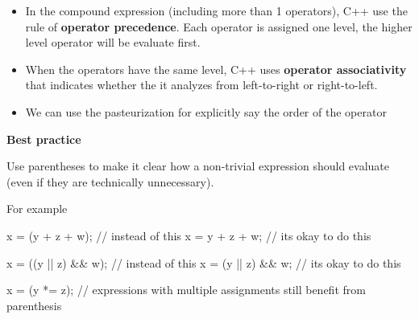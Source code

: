\documentclass[
  letterpaper,
  DIV=11,
  numbers=noendperiod]{scrreprt}
\newenvironment{Shaded}{\begin{snugshade}}{\end{snugshade}}
\newcommand{\ErrorTok}[1]{\textcolor[rgb]{0.68,0.00,0.00}{#1}}
\newcommand{\NormalTok}[1]{\textcolor[rgb]{0.00,0.23,0.31}{#1}}
\newcommand{\OtherTok}[1]{\textcolor[rgb]{0.00,0.23,0.31}{#1}}
\newcommand{\SpecialCharTok}[1]{\textcolor[rgb]{0.37,0.37,0.37}{#1}}
\newcommand{\StringTok}[1]{\textcolor[rgb]{0.13,0.47,0.30}{#1}}
\begin{document}
\begin{itemize}
\item
  In the compound expression (including more than 1 operators), C++ use
  the rule of \textbf{operator precedence}. Each operator is assigned
  one level, the higher level operator will be evaluate first.
\item
  When the operators have the same level, C++ uses \textbf{operator
  associativity} that indicates whether the it analyzes from
  left-to-right or right-to-left.
\item
  We can use the pasteurization for explicitly say the order of the
  operator
\end{itemize}

\begin{tcolorbox}[enhanced jigsaw, toprule=.15mm, rightrule=.15mm, opacityback=0, breakable, leftrule=.75mm, colback=white, colframe=quarto-callout-tip-color-frame, arc=.35mm, left=2mm, bottomrule=.15mm]
\begin{minipage}[t]{5.5mm}
\textcolor{quarto-callout-tip-color}{\faLightbulb}
\end{minipage}%
\begin{minipage}[t]{\textwidth - 5.5mm}

\textbf{Best practice}\vspace{2mm}

Use parentheses to make it clear how a non-trivial expression should
evaluate (even if they are technically unnecessary).

\end{minipage}%
\end{tcolorbox}

For example

\begin{Shaded}
\begin{Highlighting}[]
\NormalTok{x }\OtherTok{=}\NormalTok{ (y }\SpecialCharTok{+}\NormalTok{ z }\SpecialCharTok{+}\NormalTok{ w);   }\SpecialCharTok{/}\ErrorTok{/}\NormalTok{ instead of this}
\NormalTok{x }\OtherTok{=}\NormalTok{ y }\SpecialCharTok{+}\NormalTok{ z }\SpecialCharTok{+}\NormalTok{ w;     }\SpecialCharTok{/}\ErrorTok{/}\NormalTok{ it}\StringTok{\textquotesingle{}s okay to do this}

\StringTok{x = ((y || z) \&\& w); // instead of this}
\StringTok{x = (y || z) \&\& w;   // it\textquotesingle{}}\NormalTok{s okay to do this}

\NormalTok{x }\OtherTok{=}\NormalTok{ (y }\SpecialCharTok{*}\ErrorTok{=}\NormalTok{ z); }\SpecialCharTok{/}\ErrorTok{/}\NormalTok{ expressions with multiple assignments still benefit from parenthesis}
\end{Highlighting}
\end{Shaded}
\end{document}
